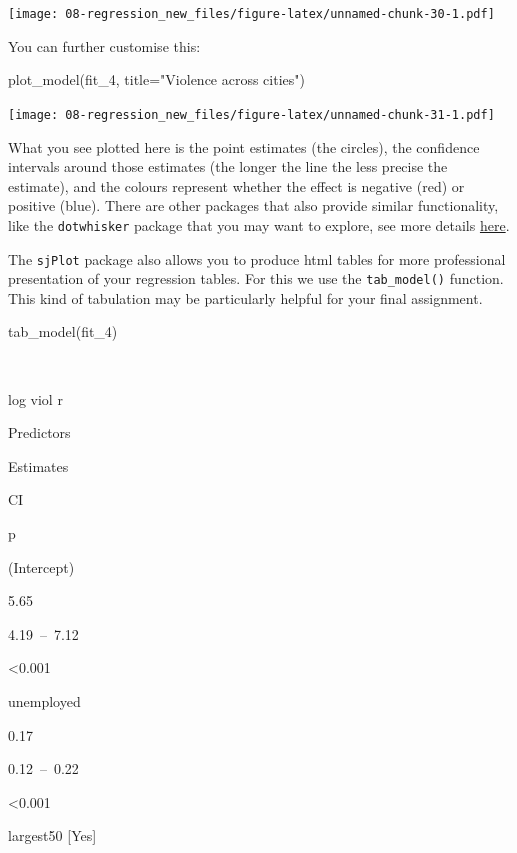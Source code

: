 \documentclass[
]{book}
\newenvironment{Shaded}{\begin{snugshade}}{\end{snugshade}}
\newcommand{\AttributeTok}[1]{\textcolor[rgb]{0.77,0.63,0.00}{#1}}
\newcommand{\FunctionTok}[1]{\textcolor[rgb]{0.00,0.00,0.00}{#1}}
\newcommand{\NormalTok}[1]{#1}
\newcommand{\StringTok}[1]{\textcolor[rgb]{0.31,0.60,0.02}{#1}}
\begin{document}
\texttt{[image: 08-regression\_new\_files/figure-latex/unnamed-chunk-30-1.pdf]}

You can further customise this:

\begin{Shaded}
\begin{Highlighting}[]
\FunctionTok{plot\_model}\NormalTok{(fit\_4, }\AttributeTok{title=}\StringTok{"Violence across cities"}\NormalTok{)}
\end{Highlighting}
\end{Shaded}

\texttt{[image: 08-regression\_new\_files/figure-latex/unnamed-chunk-31-1.pdf]}

What you see plotted here is the point estimates (the circles), the confidence intervals around those estimates (the longer the line the less precise the estimate), and the colours represent whether the effect is negative (red) or positive (blue). There are other packages that also provide similar functionality, like the \texttt{dotwhisker} package that you may want to explore, see more details \href{https://cran.r-project.org/web/packages/dotwhisker/vignettes/dotwhisker-vignette.html}{here}.

The \texttt{sjPlot} package also allows you to produce html tables for more professional presentation of your regression tables. For this we use the \texttt{tab\_model()} function. This kind of tabulation may be particularly helpful for your final assignment.

\begin{Shaded}
\begin{Highlighting}[]
\FunctionTok{tab\_model}\NormalTok{(fit\_4)}
\end{Highlighting}
\end{Shaded}

~

log viol r

Predictors

Estimates

CI

p

(Intercept)

5.65

4.19~--~7.12

\textless0.001

unemployed

0.17

0.12~--~0.22

\textless0.001

largest50 {[}Yes{]}
\end{document}
